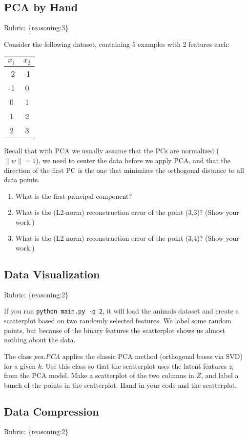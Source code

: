 \documentclass{article}
\def\rubric#1{\gre{Rubric: \{#1\}}}{}
\def\blu#1{{\color{blu}#1}}
\def\gre#1{{\color{gre}#1}}
\def\norm#1{\|#1\|}
\def\enum#1{\begin{enumerate}#1\end{enumerate}}
\begin{document}
\subsection{PCA by Hand}
\rubric{reasoning:3}


Consider the following dataset, containing 5 examples with 2 features each:
\begin{center}
\begin{tabular}{cc}
$x_1$ & $x_2$\\
\hline
-2 & -1\\
-1 & 0\\
0 & 1\\
1 & 2\\
2 & 3\\
\end{tabular}
\end{center}
Recall that with PCA we usually assume that the PCs are normalized ($\norm{w} = 1$), we need to center the data before we apply PCA, and that the direction of the first PC is the one that minimizes the orthogonal distance to all data points.
\blu{
\enum{
\item What is the first principal component?
\item What is the (L2-norm) reconstruction error of the point (3,3)? (Show your work.)
\item What is the (L2-norm) reconstruction error of the point (3,4)? (Show your work.)
}
}

\subsection{Data Visualization}
\rubric{reasoning:2}

If you run \verb|python main.py -q 2|, it will load the animals dataset and create a scatterplot based on two randomly selected features.
We label some random points, but because of the binary features the scatterplot shows us almost nothing about the data.

The class \emph{pca.PCA} applies the classic PCA method (orthogonal bases via SVD) for a given $k$.
Use this class so that the scatterplot uses the latent features $z_i$ from the PCA model.
Make a scatterplot of the two columns in $Z$, and label a bunch of the points in the scatterplot. \blu{Hand in your code and the scatterplot}.


\subsection{Data Compression}
\rubric{reasoning:2}
\end{document}

